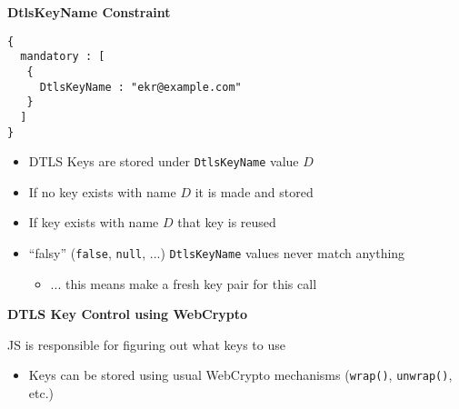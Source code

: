 \documentclass[helvetica]{seminar}
\newcommand{\heading}[1]{%
  \begin{center} 
    \large\bf 
    #1 
  \end{center} 
  \vspace{.4 in}}
\begin{document}
\begin{slide}
\heading{DtlsKeyName Constraint}

\vspace{-.25in}
\begin{verbatim}
{
  mandatory : [
   {
     DtlsKeyName : "ekr@example.com"
   }
  ] 
}
\end{verbatim}

\begin{itemize}
\item DTLS Keys are stored under \verb^DtlsKeyName^ value $D$
\item If no key exists with name $D$ it is made and stored
\item If key exists with name $D$ that key is reused
\item ``falsy'' (\verb^false^, \verb^null^, ...) \verb^DtlsKeyName^ values never match anything
  \begin{itemize}
    \item ... this means make a fresh key pair for this call
  \end{itemize}
\end{itemize}
\end{slide}


\begin{slide}
\heading{DTLS Key Control using WebCrypto}


\item JS is responsible for figuring out what keys to use
  \begin{itemize}
    \item Keys can be stored using usual WebCrypto mechanisms (\verb^wrap()^, \verb^unwrap()^, etc.)
  \end{itemize}
\end{slide}
\end{document}
